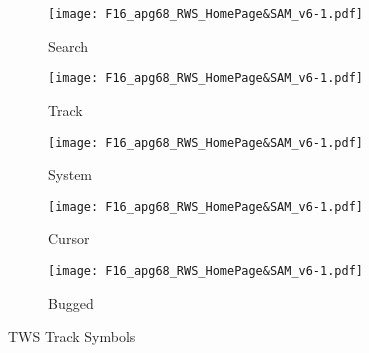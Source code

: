 \begin{figure}[htbp]
    \centering
    \begin{subfigure}[b]{0.15\linewidth}
        \centering
        \texttt{[image: F16\_apg68\_RWS\_HomePage\&SAM\_v6-1.pdf]}
        \caption{Search}
        \label{fig:sensorsaa:apg68:tws:trackfile:search}
    \end{subfigure}
    \begin{subfigure}[b]{0.15\linewidth}
        \centering
        \texttt{[image: F16\_apg68\_RWS\_HomePage\&SAM\_v6-1.pdf]}
        \caption{Track}
        \label{fig:sensorsaa:apg68:tws:trackfile:track}
    \end{subfigure}
    \begin{subfigure}[b]{0.15\linewidth}
        \centering
        \texttt{[image: F16\_apg68\_RWS\_HomePage\&SAM\_v6-1.pdf]}
        \caption{System}
        \label{fig:sensorsaa:apg68:tws:trackfile:system}
    \end{subfigure}
    \begin{subfigure}[b]{0.15\linewidth}
        \centering
        \texttt{[image: F16\_apg68\_RWS\_HomePage\&SAM\_v6-1.pdf]}
        \caption{Cursor}
        \label{fig:sensorsaa:apg68:tws:trackfile:cursor}
    \end{subfigure}
    \begin{subfigure}[b]{0.15\linewidth}
        \centering
        \texttt{[image: F16\_apg68\_RWS\_HomePage\&SAM\_v6-1.pdf]}
        \caption{Bugged}
        \label{fig:sensorsaa:apg68:tws:trackfile:bugged}
    \end{subfigure}
    \caption{TWS Track Symbols}
    \label{fig:sensorsaa:apg68:tws:trackfile}
\end{figure}

